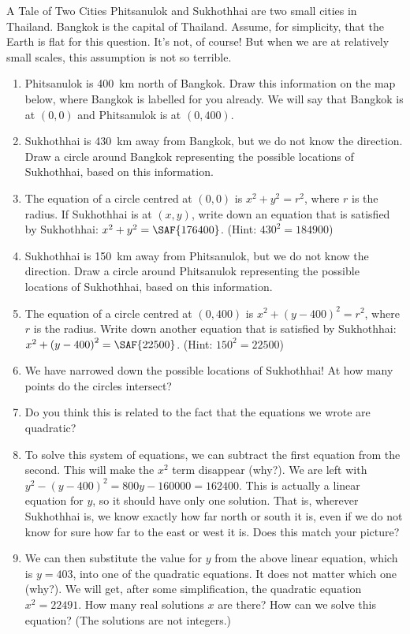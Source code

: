 \documentclass[12pt,letterpaper]{article}
\begin{document}
\begin{problem}{A Tale of Two Cities}
  Phitsanulok and Sukhothhai are two small cities in Thailand. Bangkok is the capital of
  Thailand.  Assume, for simplicity, that the Earth is flat for this question. It's not, of
  course! But when we are at relatively small scales, this assumption is not so terrible.

  \begin{enumerate}
    \item Phitsanulok is \SI{400}{\kilo\meter} north of Bangkok. Draw this information on
    the map below, where Bangkok is labelled for you already. We will say that Bangkok is at
    $(0, 0)$ and Phitsanulok is at $(0, 400)$.
    \item Sukhothhai is \SI{430}{\kilo\meter} away from Bangkok, but we do not know the
    direction. Draw a circle around Bangkok representing the possible locations of
    Sukhothhai, based on this information.
    \item The equation of a circle centred at $(0, 0)$ is $x^2 + y^2 = r^2$, where $r$ is
    the radius. If Sukhothhai is at $(x, y)$, write down an equation that is satisfied by
    Sukhothhai: $x^2 + y^2 = \SAF{176400}$. (Hint: $430^2 = 184900$)
    \item Sukhothhai is \SI{150}{\kilo\meter} away from Phitsanulok, but we do not know the
    direction. Draw a circle around Phitsanulok representing the possible locations of
    Sukhothhai, based on this information.
    \item The equation of a circle centred at $(0, 400)$ is $x^2 + {(y - 400)}^2 = r^2$, where
    $r$ is the radius. Write down another equation that is satisfied by Sukhothhai: $x^2 +
    {(y - 400)}^2 = \SAF{22500}$. (Hint: $150^2 = 22500$)
    \item We have narrowed down the possible locations of Sukhothhai! At how many points do
    the circles intersect? 
    \item Do you think this is related to the fact that the equations we wrote are
    quadratic? \hfill \TFTrue
    \item To solve this system of equations, we can subtract the first equation from the
    second. This will make the $x^2$ term disappear (why?). We are left with $y^2 - {(y -
    400)}^2 = 800y - 160000 = 162400$. This is actually a linear equation for $y$, so it
    should have only one solution. That is, wherever Sukhothhai is, we know exactly how far
    north or south it is, even if we do not know for sure how far to the east or west it is.
    Does this match your picture? \hfill \TFTrue
    \item We can then substitute the value for $y$ from the above linear equation, which is
    $y = 403$, into one of the quadratic equations. It does not matter which one (why?). We
    will get, after some simplification, the quadratic equation $x^2 = 22491$. How many real
    solutions $x$ are there? How can we solve this equation? (The solutions are not
    integers.)
  \end{enumerate}


\end{problem}
\end{document}
